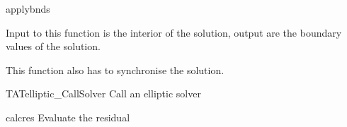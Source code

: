 \begin{FunctionDescription}{applybnds}{}
\begin{Discussion}
Input to this function is the interior of the solution, output are the
boundary values of the solution.

This function also has to synchronise the solution.
\end{Discussion}

\begin{SeeAlsoSection}
\begin{SeeAlso}{TATelliptic\_CallSolver}
Call an elliptic solver
\end{SeeAlso}
\begin{SeeAlso}{calcres}
Evaluate the residual
\end{SeeAlso}
\end{SeeAlsoSection}

\end{FunctionDescription}



